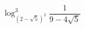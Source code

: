 \begin{ex}[type=calculate]
	\begin{condition}
		\( \log^3_{(2-\sqrt{5})^2}\dfrac{1}{9-4\sqrt{5}} \)
	\end{condition}
\end{ex}